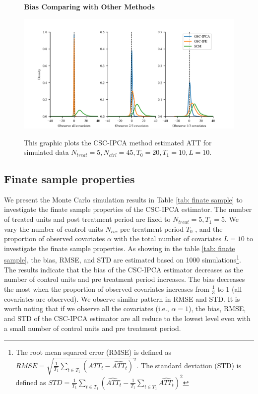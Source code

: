 \documentclass[12pt]{article}
\begin{document}
\begin{figure}[!ht]
\centering
\caption{\textbf{Bias Comparing with Other Methods}}
\includegraphics{figs/bias_compar1.png}
\label{fig: bias}
\caption*{\footnotesize{This graphic plots the CSC-IPCA method estimated ATT for simulated data $N_{treat} = 5, N_{ctrl} = 45, T_0=20, T_1=10, L=10$.}}
\end{figure}

\subsection{Finate sample properties}
We present the Monte Carlo simulation results in Table \ref{tab: finate sample} to investigate the finate sample properties of the CSC-IPCA estimator. The number of treated units and post treatment period are fixed to $N_{treat} = 5, T_1=5$. We vary the number of control units $N_{co}$, pre treatment period $T_0$ , and the proportion of observed covariates $\alpha$ with the total number of covariates $L=10$ to investigate the finate sample properties. As showing in the table \ref{tab: finate sample}, the bias, RMSE, and STD are estimated based on 1000 simulations\footnote{The root mean squared error (RMSE) is defined as $RMSE = \sqrt{\frac{1}{T_1}\sum_{t \in T_1}\left(ATT_t - \widehat{ATT}_t\right)^2}$. The standard deviation (STD) is defined as $STD = \frac{1}{T_1}\sum_{t \in T_1}\left(\widehat{ATT}_t - \frac{1}{T_1}\sum_{t \in T_1}\widehat{ATT_t}\right)^2$}. The results indicate that the bias of the CSC-IPCA estimator decreases as the number of control units and pre treatment period increases. The bias decreases the most when the proportion of observed covariates increases from $\frac{1}{3}$ to 1 (all covariates are observed). We observe similar pattern in RMSE and STD. It is worth noting that if we observe all the covariates (i.e., $\alpha = 1$), the bias, RMSE, and STD of the CSC-IPCA estimator are all reduce to the lowest level even with a small number of control units and pre treatment period.
\end{document}
